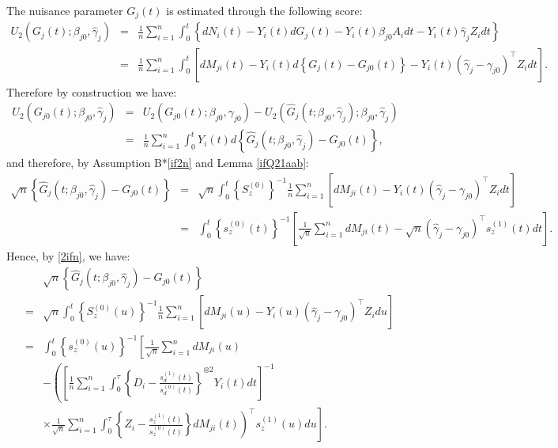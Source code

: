 \documentclass[11pt]{article}
\newcommand{\ee}{\end{eqnarray}}
\newcommand{\eqnn}{\begin{eqnarray*}}
\newcommand{\een}{\end{eqnarray*}}
\newcommand{\be}{\begin{eqnarray}}
\begin{document}
\begin{newproof16}
The nuisance parameter $G_{j}(t)$ is estimated through the following score:
\eqnn
U_2(G_j(t) ; \beta_{j0}, \hat \gamma_j)&=&\frac{1}{n}\sum_{i=1}^n\int_0^{t}\left\{dN_i(t)-Y_i(t)dG_j(t)-Y_i(t)\beta_{j0}A_idt-Y_i(t)\hat \gamma_jZ_idt\right\}\\
&=&\frac{1}{n}\sum_{i=1}^n\int_0^{t}\left[dM_{ji}(t)-Y_i(t)d\left\{G_j(t)-G_{j0}(t)\right\}-Y_i(t)(\hat \gamma_j-\gamma_{j0})^\top Z_idt\right].
\een
Therefore by construction we have:
\eqnn
U_2(G_{j0}(t) ; \beta_{j0}, \hat \gamma_j)&=&U_2(G_{j0}(t) ; \beta_{j0}, \gamma_{j0})-U_2(\hat G_j(t ; \beta_{j0}, \hat \gamma_j); \beta_{j0}, \hat \gamma_j)\\
&=&\frac{1}{n}\sum_{i=1}^n\int_0^tY_i(t)d\left\{\hat G_j(t ; \beta_{j0}, \hat \gamma_j)-G_{j0}(t)\right\},
\een
and therefore, by Assumption B*\ref{if2n} and Lemma \ref{ifQ21aab}:
\be
\sqrt{n}\left\{\hat G_j(t ; \beta_{j0}, \hat \gamma_j)-G_{j0}(t)\right\}&=&\sqrt{n}\int_0^{t}\left\{S_z^{(0)}\right\}^{-1}\frac{1}{n}\sum_{i=1}^n\left[dM_{ji}(t)-Y_i(t)(\hat \gamma_j-\gamma_{j0})^\top Z_idt\right]\\
&=&\int_0^t\left\{s_z^{(0)}(t)\right\}^{-1}\left[\frac{1}{\sqrt{n}}\sum_{i=1}^ndM_{ji}(t)-\sqrt{n}(\hat \gamma_j-\gamma_{j0})^\top s_z^{(1)}(t)dt\right].\nonumber
\ee
Hence, by \eqref{2ifn}, we have:
\be\label{1ifn}
&&\sqrt{n}\left\{\hat G_j(t ; \beta_{j0}, \hat \gamma_j)-G_{j0}(t)\right\}\\&=&\sqrt{n}\int_0^{t}\left\{S_z^{(0)}(u)\right\}^{-1}\frac{1}{n}\sum_{i=1}^n\left[dM_{ji}(u)-Y_i(u)(\hat \gamma_j-\gamma_{j0})^\top Z_idu\right]\nonumber\\
&=&\int_0^t\left\{s_z^{(0)}(u)\right\}^{-1}\left[\frac{1}{\sqrt{n}}\sum_{i=1}^ndM_{ji}(u)\right.\nonumber\\
&&
\left.-\left(\left[\frac{1}{n}\sum_{i=1}^n\int_0^{\tau}\left\{D_i-\frac{s_d^{(1)}(t)}{s_d^{(0)}(t)}\right\}^{\otimes 2}Y_i(t)dt\right]^{-1}\right.\right. \\ &&\left.\left.\times\frac{1}{\sqrt{n}}\sum_{i=1}^n
\int_0^\tau \left\{Z_i-\frac{s_z^{(1)}(t)}{s_z^{(0)}(t)}\right\}dM_{ji}(t)\right)^\top s_z^{(1)}(u)du\right].\nonumber
\ee
\end{newproof16}
\end{document}
